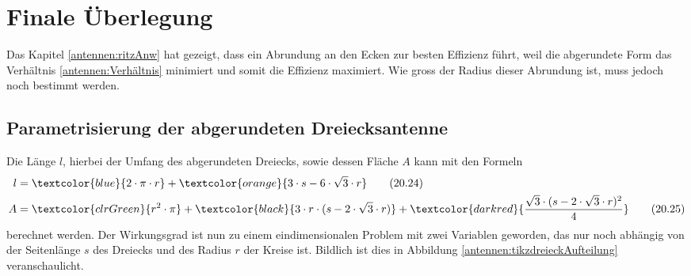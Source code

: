 %
%
% 
%
%
\usetikzlibrary{spy}
\section{Finale Überlegung\label{antennen:resultat}}

Das Kapitel \ref{antennen:ritzAnw} hat gezeigt, dass ein Abrundung an den Ecken
zur besten Effizienz führt, weil die abgerundete Form das Verhältnis \eqref{antennen:Verhältnis}
minimiert und somit die Effizienz maximiert. Wie gross der Radius dieser Abrundung
ist, muss jedoch noch bestimmt werden.


\subsection{Parametrisierung der abgerundeten Dreiecksantenne\label{antennen:param3eck}}
Die Länge $l$, hierbei der Umfang 
des abgerundeten Dreiecks, sowie dessen Fläche $A$ kann mit den Formeln
\begin{align}
	l &= \textcolor{blue}{2 \cdot \pi \cdot r} + \textcolor{orange}{3 \cdot s - 6 \cdot \sqrt{3} \cdot r} \tag{20.24} \label{antennen:Länge} \\
	A &= \textcolor{clrGreen}{r^2 \cdot \pi} + \textcolor{black}{3 \cdot r \cdot (s - 2 \cdot \sqrt{3} \cdot r)} + \textcolor{darkred}{\frac{\sqrt{3} \cdot (s - 2 \cdot \sqrt{3} \cdot r)^2}{4}} \tag{20.25} \label{antennen:Fläche}
\end{align}\setcounter{equation}{25}
berechnet werden.
Der Wirkungsgrad ist nun zu einem eindimensionalen Problem mit zwei Variablen geworden, das nur noch abhängig von 
der Seitenlänge $s$ des Dreiecks und des Radius $r$ der Kreise ist. Bildlich ist dies 
in Abbildung \ref{antennen:tikzdreieckAufteilung} veranschaulicht.

